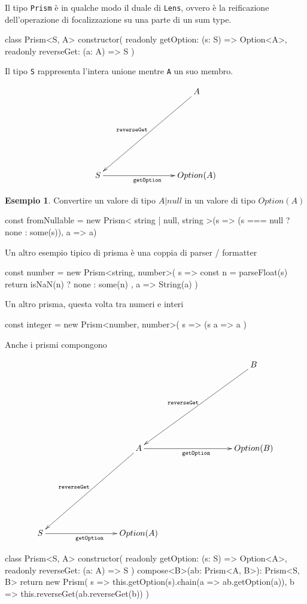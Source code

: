 \documentclass[12pt]{article}
\theoremstyle{definition}
\newtheorem{example}{Esempio}[section]
\newenvironment{code}
  {\vspace{0.5cm} \VerbatimEnvironment\begin{typescriptcode}}
  {\end{typescriptcode} \vspace{0.2cm}}
\begin{document}
Il tipo \texttt{Prism} è in qualche modo il duale di \texttt{Lens}, ovvero è la reificazione dell'operazione di focalizzazione
su una parte di un sum type.

\begin{code}
class Prism<S, A> {
  constructor(
    readonly getOption: (s: S) => Option<A>,
    readonly reverseGet: (a: A) => S
  ) {}
}
\end{code}

Il tipo \texttt{S} rappresenta l'intera unione mentre \texttt{A} un suo membro.

\[
\xymatrixrowsep{3cm}
\xymatrixcolsep{3cm}
\xymatrix{
  & A \ar[dl]_{\texttt{reverseGet}} \\
  S \ar[r]_{\texttt{getOption}} & {Option(A)}
}
\]

\begin{example}
Convertire un valore di tipo $A | null$ in un valore di tipo $Option(A)$

\begin{code}
const fromNullable = new Prism<
  string | null,
  string
>(s => (s === null ? none : some(s)), a => a)
\end{code}

\end{example}

Un altro esempio tipico di prisma è una coppia di parser / formatter

\begin{code}
const number = new Prism<string, number>(
  s => {
    const n = parseFloat(s)
    return isNaN(n) ? none : some(n)
  },
  a => String(a)
)
\end{code}

Un altro prisma, questa volta tra numeri e interi

\begin{code}
const integer = new Prism<number, number>(
  s => (s %
  a => a
)
\end{code}

Anche i prismi compongono

\[
\xymatrixrowsep{3cm}
\xymatrixcolsep{3cm}
\xymatrix{
  & & B \ar[dl]_{\texttt{reverseGet}} \\
  & A \ar[dl]_{\texttt{reverseGet}} \ar[r]_{\texttt{getOption}} & {Option(B)} \\
  S \ar[r]_{\texttt{getOption}} & {Option(A)}
}
\]

\begin{code}
class Prism<S, A> {
  constructor(
    readonly getOption: (s: S) => Option<A>,
    readonly reverseGet: (a: A) => S
  ) {}
  compose<B>(ab: Prism<A, B>): Prism<S, B> {
    return new Prism(
      s => this.getOption(s).chain(a => ab.getOption(a)),
      b => this.reverseGet(ab.reverseGet(b))
    )
  }
}
\end{code}
\end{document}
